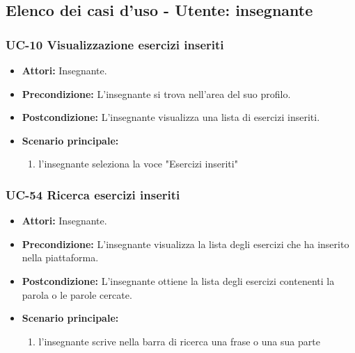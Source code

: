\subsection{Elenco dei casi d'uso - Utente: insegnante}		
\subsubsection{UC-10 Visualizzazione esercizi inseriti}
\begin{itemize}
\item \textbf{Attori: }Insegnante.
		\item \textbf{Precondizione: }L'insegnante si trova nell'area del suo profilo.
		\item \textbf{Postcondizione: }L'insegnante visualizza una lista di esercizi inseriti. 
		\item \textbf{Scenario principale:}
		\begin{enumerate}
			\item l'insegnante seleziona la voce "Esercizi inseriti"
		\end{enumerate}
	\end{itemize}

\subsubsection{UC-54 Ricerca esercizi inseriti}
\begin{itemize}
	\item \textbf{Attori:} Insegnante.
	\item \textbf{Precondizione:} L'insegnante visualizza la lista degli esercizi che ha inserito nella piattaforma.
	\item \textbf{Postcondizione:} L'insegnante ottiene la lista degli esercizi contenenti la parola o le parole cercate.
	\item \textbf{Scenario principale:}
		\begin{enumerate}
				\item l'insegnante scrive nella barra di ricerca una frase o una sua parte
		\end{enumerate}
\end{itemize}

